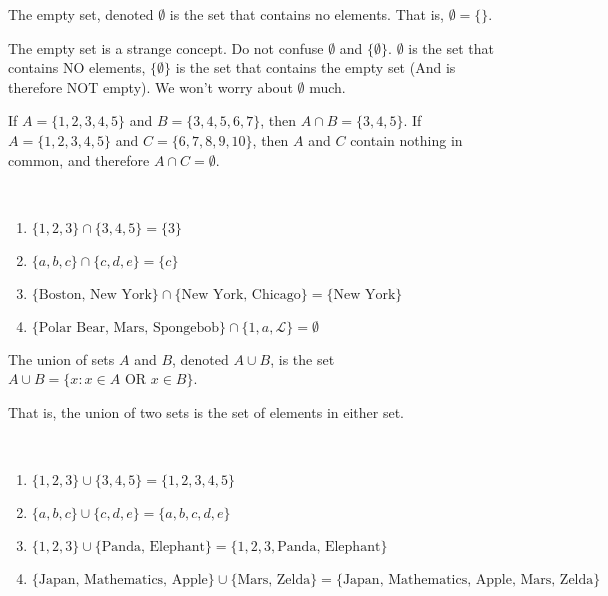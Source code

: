 \documentclass[crop=false,class=article,oneside]{standalone}
\begin{document}
        \begin{definition}
            The empty set, denoted $\emptyset$ is the set that contains
            no elements. That is, $\emptyset=\{\}$.
        \end{definition}
        \begin{remark}
            The empty set is a strange concept. Do not confuse
            $\emptyset$ and $\{\emptyset\}$. $\emptyset$ is the set that
            contains NO elements, $\{\emptyset\}$ is the set that contains
            the empty set (And is therefore NOT empty).
            We won't worry about $\emptyset$ much.
        \end{remark}
        \begin{example}
            If $A=\{1,2,3,4,5\}$ and $B=\{3,4,5,6,7\}$,
            then $A\cap{B}=\{3,4,5\}$. If $A=\{1,2,3,4,5\}$ and
            $C=\{6,7,8,9,10\}$, then $A$ and $C$ contain nothing in common,
            and therefore $A\cap{C}=\emptyset$.
        \end{example}
        \begin{example}
            \
            \begin{enumerate}
                \item $\{1,2,3\}\cap\{3,4,5\}=\{3\}$
                \item $\{a,b,c\}\cap\{c,d,e\}=\{c\}$
                \item $\{\textrm{Boston, New York}\}\cap%
                       \{\textrm{New York, Chicago}\}=\{\textrm{New York}\}$
                \item $\{\textrm{Polar Bear, Mars, Spongebob}\}%
                       \cap\{1,a,\mathcal{L}\}=\emptyset$
            \end{enumerate}
        \end{example}
        \begin{definition}
            The union of sets $A$ and $B$, denoted $A\cup{B}$, is the
            set $A\cup{B}=\{x:x\in{A}\textrm{ OR }x\in{B}\}$.
        \end{definition}
        \begin{remark}
            That is, the union of two sets is the set of
            elements in either set.
        \end{remark}
        \begin{example}
            \
            \begin{enumerate}
                \item $\{1,2,3\}\cup\{3,4,5\}=\{1,2,3,4,5\}$
                \item $\{a,b,c\}\cup\{c,d,e\}=\{a,b,c,d,e\}$
                \item $\{1,2,3\}\cup\{\textrm{Panda, Elephant}\}%
                       =\{1,2,3,\textrm{Panda, Elephant}\}$
                \item $\{\textrm{Japan, Mathematics, Apple}\}\cup%
                       \{\textrm{Mars, Zelda}\}%
                       =\{\textrm{Japan, Mathematics, Apple, Mars, Zelda}\}$
            \end{enumerate}
        \end{example}
\end{document}
